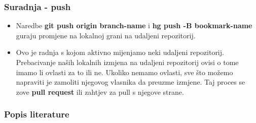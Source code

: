 \documentclass{beamer}
\begin{document}
	\begin{frame}
		\frametitle{Suradnja - push}
		\begin{itemize}
			\item Naredbe \textbf{git  push origin branch-name} i \textbf{hg push -B bookmark-name} guraju promjene na lokalnoj grani na udaljeni repozitorij.
			\item  Ovo je radnja s kojom aktivno mijenjamo neki udaljeni repozitorij. Prebacivanje naših lokalnih izmjena na udaljeni repozitorij ovisi o tome imamo li ovlasti za to ili ne. Ukoliko nemamo ovlasti, sve što možemo napraviti je zamoliti njegovog vlasnika da preuzme izmjene. Taj proces se zove \textbf{pull request} ili zahtjev za pull s njegove strane. 
		\end{itemize}
	\end{frame}

	\begin{frame}
		\frametitle{Popis literature}
		
		
		\nocite{VCbE:1}
		\nocite{VC}
		\nocite{ProGit}
		\nocite{WEBSITE:1}	
		 
		
	\end{frame}
\end{document}
